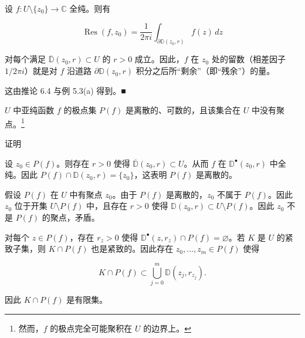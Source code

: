 \begin{remark}

\begin{items}
\item

设 $ f : U\setminus\{z_{0}\} \to \mathbb{C} $ 全纯。则有

\[
\operatorname{Res}(f,z_{0}) = \frac{1}{2\pi i}\int_{\partial\mathbb{D}(z_{0},r)}f(z)\,dz
\]

对每个满足 $ \overline{\mathbb{D}}(z_{0},r) \subset U $ 的 $ r > 0 $ 成立。因此，$ f $ 在 $ z_{0} $ 处的留数（相差因子 $ 1/2\pi i $）就是对 $ f $ 沿道路 $ \partial\mathbb{D}(z_{0},r) $ 积分之后所“剩余”（即“残余”）的量。

\proofhead
这由推论 6.4 与例 5.3(a) 得到。\nobreak\hspace{0.35em}■
\item

$ U $ 中亚纯函数 $ f $ 的极点集 $ P(f) $ 是离散的、可数的，且该集合在 $ U $ 中没有聚点。\footnote{然而，$ f $ 的极点完全可能聚积在 $ U $ 的边界上。}

\end{items}

证明

\begin{subitems}
\item

设 $ z_{0} \in P(f) $。则存在 $ r > 0 $ 使得 $ \overline{\mathbb{D}}(z_{0},r) \subset U $。从而 $ f $ 在 $ \mathbb{D}^{\bullet}(z_{0},r) $ 中全纯。因此 $ P(f)\cap\mathbb{D}(z_{0},r) = \{z_{0}\} $，这表明 $ P(f) $ 是离散的。

\item

假设 $ P(f) $ 在 $ U $ 中有聚点 $ z_{0} $。由于 $ P(f) $ 是离散的，$ z_{0} $ 不属于 $ P(f) $。因此 $ z_{0} $ 位于开集 $ U\setminus P(f) $ 中，且存在 $ r > 0 $ 使得 $ \mathbb{D}(z_{0},r) \subset U\setminus P(f) $。因此 $ z_{0} $ 不是 $ P(f) $ 的聚点，矛盾。

\item

对每个 $ z \in P(f) $，存在 $ r_{z} > 0 $ 使得 $ \mathbb{D}^{\bullet}(z,r_{z})\cap P(f) = \varnothing $。若 $ K $ 是 $ U $ 的紧致子集，则 $ K\cap P(f) $ 也是紧致的。因此存在 $ z_{0},\ldots,z_{m} \in P(f) $ 使得

\[
K\cap P(f) \subset \bigcup_{j=0}^{m}\mathbb{D}(z_{j},r_{z_{j}}) .
\]

因此 $ K\cap P(f) $ 是有限集。

\item


\end{subitems}
\end{remark}
